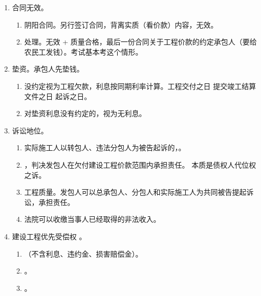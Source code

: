 \begin{enumerate}
\begin{enumerate}
          \item 合同无效。
                \begin{enumerate}
                  \item 阴阳合同。另行签订合同，背离实质（看价款）内容，无效。
                  \item 处理。无效 + 质量合格，最后一份合同关于工程价款的约定承包人（要给农民工发钱）。考试基本考这个情形。
                \end{enumerate}
          \item 垫资。承包人先垫钱。
                \begin{enumerate}
                  \item 没约定视为工程欠款，利息按同期利率计算。工程交付之日 \dy 提交竣工结算文件之日 \dy 起诉之日。
                  \item 对垫资利息没有约定的，视为无利息。
                \end{enumerate}
          \item 诉讼地位。
                \begin{enumerate}
                  \item 实际施工人以转包人、违法分包人为被告起诉的，。
                  \item {}，判决发包人在欠付建设工程价款范围内承担责任。
                        本质是债权人代位权之诉。
                  \item 工程质量。发包人可以总承包人、分包人和实际施工人为共同被告提起诉讼，承担责任。
                  \item 法院可以收缴当事人已经取得的非法收入。
                \end{enumerate}
          \item 建设工程优先受偿权 \yjt {}。
                \begin{enumerate}
                  \item {}（不含利息、违约金、损害赔偿金）。
                  \item {}。
                  \item {}。
                \end{enumerate}
        \end{enumerate}
\end{enumerate}
